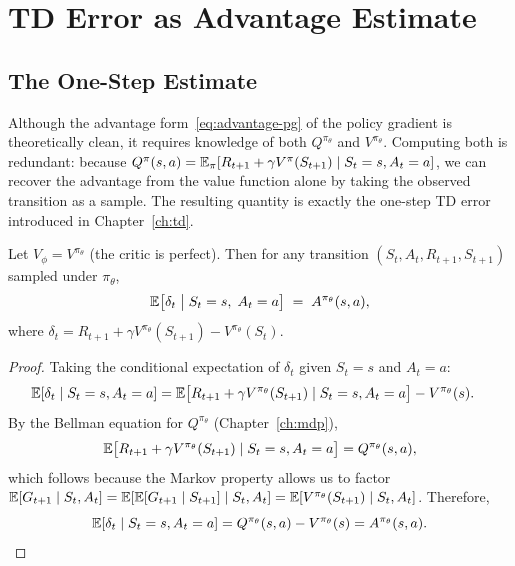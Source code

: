 \section{TD Error as Advantage Estimate}
\label{sec:td-error-advantage}

\subsection{The One-Step Estimate}

Although the advantage form~\eqref{eq:advantage-pg} of the policy gradient is
theoretically clean, it requires knowledge of both $Q^{\pi_\theta}$ and
$V^{\pi_\theta}$.  Computing both is redundant: because
$Q^\pi(s,a) = \operatorname{\mathbb{E}}_\pi[R_{t+1} + \gamma V^\pi(S_{t+1}) \mid S_t=s, A_t=a]$,
we can recover the advantage from the value function alone by taking the
observed transition as a sample.  The resulting quantity is exactly the
one-step TD error introduced in Chapter~\ref{ch:td}.

\begin{theorem}
\label{thm:td-error-advantage}
Let $V_\phi = V^{\pi_\theta}$ (the critic is perfect).  Then for any
transition $(S_t, A_t, R_{t+1}, S_{t+1})$ sampled under $\pi_\theta$,
\begin{equation}
\label{eq:td-as-advantage}
\operatorname{\mathbb{E}}\bigl[\delta_t \;\big|\; S_t = s,\; A_t = a\bigr]
\;=\; A^{\pi_\theta}(s, a),
\end{equation}
where $\delta_t = R_{t+1} + \gamma V^{\pi_\theta}(S_{t+1}) - V^{\pi_\theta}(S_t)$.
\end{theorem}

\begin{proof}
Taking the conditional expectation of $\delta_t$ given $S_t = s$ and $A_t = a$:
\begin{align*}
\operatorname{\mathbb{E}}[\delta_t \mid S_t = s, A_t = a]
&= \operatorname{\mathbb{E}}\bigl[R_{t+1} + \gamma V^{\pi_\theta}(S_{t+1}) \mid S_t=s, A_t=a\bigr]
   - V^{\pi_\theta}(s).
\end{align*}
By the Bellman equation for $Q^{\pi_\theta}$ (Chapter~\ref{ch:mdp}),
\[
\operatorname{\mathbb{E}}\bigl[R_{t+1} + \gamma V^{\pi_\theta}(S_{t+1}) \mid S_t=s, A_t=a\bigr]
= Q^{\pi_\theta}(s, a),
\]
which follows because the Markov property allows us to factor
$\operatorname{\mathbb{E}}[G_{t+1} \mid S_t, A_t] = \operatorname{\mathbb{E}}[\operatorname{\mathbb{E}}[G_{t+1} \mid S_{t+1}] \mid S_t, A_t]
= \operatorname{\mathbb{E}}[V^{\pi_\theta}(S_{t+1}) \mid S_t, A_t]$.
Therefore,
\[
\operatorname{\mathbb{E}}[\delta_t \mid S_t=s, A_t=a]
= Q^{\pi_\theta}(s,a) - V^{\pi_\theta}(s)
= A^{\pi_\theta}(s,a). \qedhere
\]
\end{proof}

